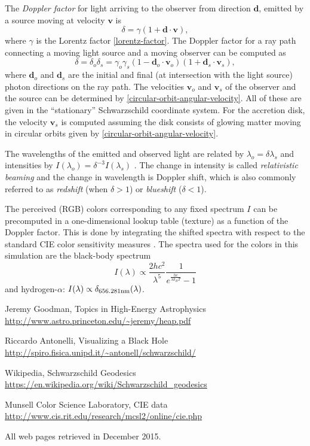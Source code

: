 \documentclass[a4paper,12pt]{article}
\def\mb{\boldsymbol}
\begin{document}
The \emph{Doppler factor} for light arriving to the observer from direction $\mb d$, emitted by a source moving at velocity $\mb v$ is \cite[\S 1.7]{astro-princeton}
\begin{equation}\label{doppler-factor-moving-source}
  \delta = \gamma (1 + \mb d \cdot \mb v),
\end{equation}
where $\gamma$ is the Lorentz factor \eqref{lorentz-factor}.
The Doppler factor for a ray path connecting a moving light source and a moving observer can be computed as
$$
 \delta = \delta_o \delta_s = \gamma_o \gamma_s (1 - \mb d_o \cdot \mb v_o)(1 + \mb d_s \cdot \mb v_s),
$$
where $\mb d_o$ and $\mb d_s$ are the initial and final (at intersection with the light source) photon directions on the ray path. The velocities $\mb v_o$ and $\mb v_s$ of the observer and the source can be determined by \eqref{circular-orbit-angular-velocity}. All of these are given in the ``stationary'' Schwarzschild coordinate system.
For the accretion disk, the velocity $\mb v_s$ is computed assuming the disk consists of glowing matter moving in circular orbits given by \eqref{circular-orbit-angular-velocity}.

The wavelengths of the emitted and observed light are related by $\lambda_o = \delta \lambda_s$ and intensities by $I(\lambda_o) = \delta^{-3} I(\lambda_s)$ \cite{astro-princeton}. The change in intensity is called \emph{relativistic beaming} and the change in wavelength is Doppler shift, which is also commonly referred to as \emph{redshift} (when $\delta > 1$) or \emph{blueshift} ($\delta < 1$).

The perceived (RGB) colors corresponding to any fixed spectrum $I$ can be precomputed in a one-dimensional lookup table (texture) as a function of the Doppler factor. This is done by integrating the shifted spectra with respect to the standard CIE color sensitivity measures \cite{cie:data}. The spectra used for the colors in this simulation are the black-body spectrum
$$
  I(\lambda) \propto \frac{2 h c^2}{\lambda^5}\frac1{e^{\frac{h c}{\lambda k_B T}} - 1}
$$
and hydrogen-$\alpha$: $I(\lambda) \propto \delta_{656.281 {\rm nm}}(\lambda)$.

\clearpage
\begin{thebibliography}{9}

 Jeremy Goodman, Topics in High-Energy Astrophysics
\newblock \url{http://www.astro.princeton.edu/~jeremy/heap.pdf}

 Riccardo Antonelli, Visualizing a Black Hole
\newblock \url{http://spiro.fisica.unipd.it/~antonell/schwarzschild/}

 Wikipedia, Schwarzschild Geodesics
\newblock \url{https://en.wikipedia.org/wiki/Schwarzschild_geodesics}

 Munsell Color Science Laboratory, CIE data
\newblock \url{http://www.cis.rit.edu/research/mcsl2/online/cie.php}


\end{thebibliography}

\noindent
All web pages retrieved in December 2015.
\end{document}
